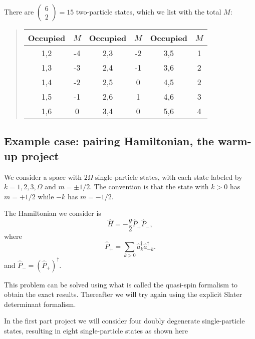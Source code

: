 \documentclass[%
twoside,                 %
final,                   %
10pt]{article}
\begin{document}
\noindent
There are $\left ( \begin{array}{c} 6 \\ 2 \end{array} \right) = 15$ two-particle states, 
which we list with the total $M$:


\begin{quote}
\begin{tabular}{cccccc}
\hline
\multicolumn{1}{c}{ Occupied } & \multicolumn{1}{c}{ $M$ } & \multicolumn{1}{c}{ Occupied } & \multicolumn{1}{c}{ $M$ } & \multicolumn{1}{c}{ Occupied } & \multicolumn{1}{c}{ $M$ } \\
\hline
1,2      & -4  & 2,3      & -2  & 3,5      & 1   \\
1,3      & -3  & 2,4      & -1  & 3,6      & 2   \\
1,4      & -2  & 2,5      & 0   & 4,5      & 2   \\
1,5      & -1  & 2,6      & 1   & 4,6      & 3   \\
1,6      & 0   & 3,4      & 0   & 5,6      & 4   \\
\hline
\end{tabular}
\end{quote}

\noindent




\subsection*{Example case: pairing Hamiltonian, the warm-up project}


We consider a space with $2\Omega$ single-particle states, with each 
state labeled by 
$k = 1, 2, 3, \Omega$ and $m = \pm 1/2$. The convention is that 
the state with $k>0$ has $m = + 1/2$ while $-k$ has $m = -1/2$.


The Hamiltonian we consider is 
\[
\hat{H} = -\frac{g}{2} \hat{P}_+ \hat{P}_-,
\]
where
\[
\hat{P}_+ = \sum_{k > 0} \hat{a}^\dagger_k \hat{a}^\dagger_{-{k}}.
\]
and $\hat{P}_- = ( \hat{P}_+)^\dagger$.

This problem can be solved using what is called the quasi-spin formalism to obtain the 
exact results. Thereafter we will try again using the explicit Slater determinant formalism.


In the first part project we will consider four doubly degenerate single-particle states, resulting in eight single-particle states as shown here
\end{document}
